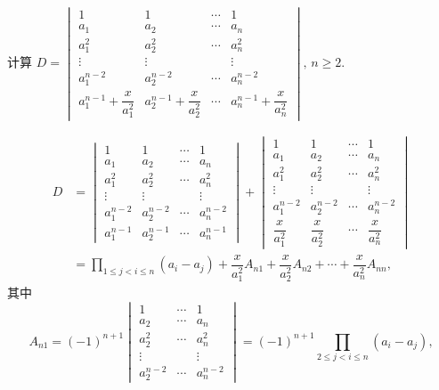 \documentclass[../../main.tex]{subfiles}
\begin{document}
\begin{example}
计算 \(D = \begin{vmatrix} 1 & 1 & \cdots & 1 \\ a_1 & a_2 & \cdots & a_n \\ a_1^2 & a_2^2 & \cdots & a_n^2 \\ \vdots & \vdots & & \vdots \\ a_1^{n - 2} & a_2^{n - 2} & \cdots & a_n^{n - 2} \\ a_1^{n - 1} + \dfrac{x}{a_1^2} & a_2^{n - 1} + \dfrac{x}{a_2^2} & \cdots & a_n^{n - 1} + \dfrac{x}{a_n^2} \end{vmatrix}, \, n \geqslant 2\).
\end{example}
\begin{solution}
\[
\begin{aligned}
D &= \begin{vmatrix} 1 & 1 & \cdots & 1 \\ a_1 & a_2 & \cdots & a_n \\ a_1^2 & a_2^2 & \cdots & a_n^2 \\ \vdots & \vdots & & \vdots \\ a_1^{n - 2} & a_2^{n - 2} & \cdots & a_n^{n - 2} \\ a_1^{n - 1} & a_2^{n - 1} & \cdots & a_n^{n - 1} \end{vmatrix} + \begin{vmatrix} 1 & 1 & \cdots & 1 \\ a_1 & a_2 & \cdots & a_n \\ a_1^2 & a_2^2 & \cdots & a_n^2 \\ \vdots & \vdots & & \vdots \\ a_1^{n - 2} & a_2^{n - 2} & \cdots & a_n^{n - 2} \\ \dfrac{x}{a_1^2} & \dfrac{x}{a_2^2} & \cdots & \dfrac{x}{a_n^2} \end{vmatrix} \\
&= \prod_{1 \leqslant j < i \leqslant n} (a_i - a_j) + \dfrac{x}{a_1^2} A_{n1} + \dfrac{x}{a_2^2} A_{n2} + \cdots + \dfrac{x}{a_n^2} A_{nn},
\end{aligned}
\]
其中
\[
A_{n1} = (-1)^{n + 1} \begin{vmatrix} 1 & \cdots & 1 \\ a_2 & \cdots & a_n \\ a_2^2 & \cdots & a_n^2 \\ \vdots & & \vdots \\ a_2^{n - 2} & \cdots & a_n^{n - 2} \end{vmatrix} = (-1)^{n + 1} \prod_{2 \leqslant j < i \leqslant n} (a_i - a_j),
\]
\end{solution}
\end{document}
